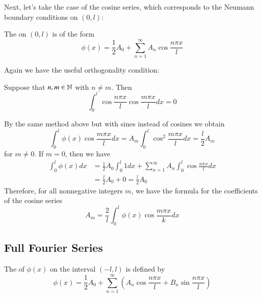 Next, let's take the case of the cosine series, which corresponds to the Neumann boundary conditions on $(0,l)$: 

\begin{definition}
    The  on $(0,l)$ is of the form \begin{equation}
        \phi(x) = \frac{1}{2}A_0+\sum_{n=1}^{\infty}A_n\cos\frac{n\pi x}{l}
    \end{equation}
\end{definition}

Again we have the useful orthogonality condition: 

\begin{proposition}
    Suppose that $n,m \in \mathbb N$ with $n \neq m$. Then \begin{equation}
        \int_0^l\cos\frac{n\pi x}{l}\cos\frac{m\pi x}{l}dx = 0
    \end{equation}
\end{proposition}
By the same method above but with sines instead of cosines we obtain \begin{equation}
    \int_0^l\phi(x)\cos\frac{m\pi x}{l}dx = A_m\int_0^l\cos^2\frac{m\pi x}{l}dx = \frac{l}{2}A_m
\end{equation}
for $m \neq 0$. If $m = 0$, then we have \begin{align*}
    \int_0^l\phi(x)dx &= \frac{1}{2}A_0\int_0^l1dx + \sum_{n=1}^{\infty}A_n\int_0^l\cos\frac{n\pi x}{l}dx \\
    &= \frac{l}{2}A_0 + 0 = \frac{l}{2}A_0
\end{align*}
Therefore, for all nonnegative integers $m$, we have the formula for the coefficients of the cosine series \begin{equation}
    \boxed{A_m = \frac{2}{l}\int_0^l\phi(x)\cos\frac{m\pi x}{k}dx}
\end{equation}

\subsection{Full Fourier Series}

\begin{definition}
    The  of $\phi(x)$ on the interval $(-l,l)$ is defined by \begin{equation}
        \boxed{\phi(x) = \frac{1}{2}A_0+\sum_{n=1}^{\infty}\left(A_n\cos\frac{n\pi x}{l}+B_n\sin\frac{n\pi x}{l}\right)}
    \end{equation}
\end{definition}

